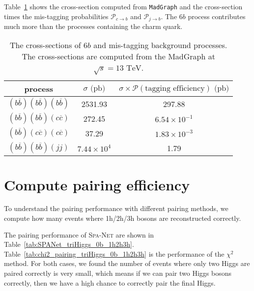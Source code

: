 \documentclass[12pt]{article}
\begin{document}
	Table~\ref{tab:cross_section_of_mis_tagging_background} shows the cross-section computed from \verb|MadGraph| and the cross-section times the mis-tagging probabilities $\mathcal{P}_{c\to b}$ and $\mathcal{P}_{j\to b}$. The $6b$ process contributes much more than the processes containing the charm quark.
	\begin{table}[htpb]
		\centering
		\caption{The cross-sections of $6b$ and mis-tagging background processes. The cross-sections are computed from the MadGraph at $\sqrt{s} = 13 \text{ TeV}$.}
		\label{tab:cross_section_of_mis_tagging_background}
		\begin{tabular}{c|cc}
		process                                         & $\sigma\text{ (pb)}$ & $\sigma\times\mathcal{P}(\text{tagging efficiency})\text{ (pb)}$ \\ \hline
		$(b\overline{b})(b\overline{b})(b\overline{b})$ & 2531.93              & 297.88                                                           \\
		$(b\overline{b})(b\overline{b})(c\overline{c})$ & 272.45               & $6.54 \times 10^{-1}$                                            \\
		$(b\overline{b})(c\overline{c})(c\overline{c})$ & 37.29                & $1.83 \times 10^{-3}$                                            \\
		$(b\overline{b})(b\overline{b})(jj)$ &   $7.44 \times 10^{4}$            & 1.79
		\end{tabular}
	\end{table}
\section{Compute pairing efficiency}%
\label{sec:compute_pairing_efficiency}
	To understand the pairing performance with different pairing methods, we compute how many events where 1h/2h/3h bosons are reconstructed correctly.

	The pairing performance of \textsc{Spa-Net} are shown in Table~\ref{tab:SPANet_triHiggs_0b_1h2h3h}. Table~\ref{tab:chi2_pairing_triHiggs_0b_1h2h3h} is the performance of the $\chi^2$ method. For both cases, we found the number of events where only two Higgs are paired correctly is very small, which means if we can pair two Higgs bosons correctly, then we have a high chance to correctly pair the final Higgs.
\end{document}
